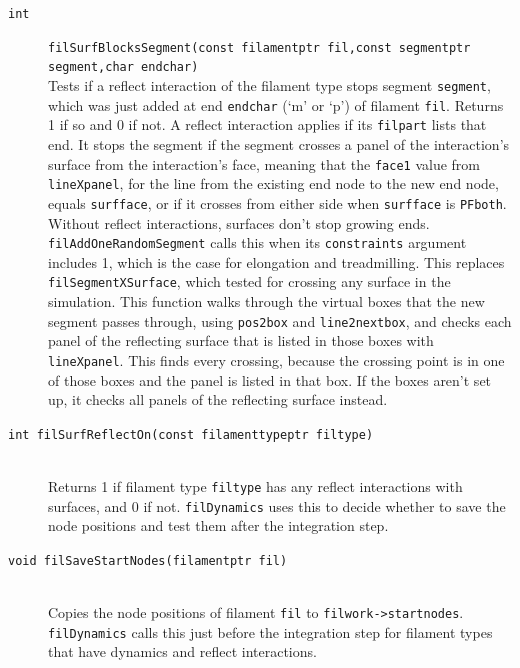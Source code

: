 \documentclass {scrbook}
\newcommand {\ttt} {\texttt}
\begin{document}
\begin{description}
\item[\ttt{int}]
\ttt{filSurfBlocksSegment(const filamentptr fil,const segmentptr segment,char endchar)}
\hfill \\
Tests if a reflect interaction of the filament type stops segment \ttt{segment}, which was just added at end \ttt{endchar} (`m' or `p') of filament \ttt{fil}. Returns 1 if so and 0 if not. A reflect interaction applies if its \ttt{filpart} lists that end. It stops the segment if the segment crosses a panel of the interaction's surface from the interaction's face, meaning that the \ttt{face1} value from \ttt{lineXpanel}, for the line from the existing end node to the new end node, equals \ttt{surfface}, or if it crosses from either side when \ttt{surfface} is \ttt{PFboth}. Without reflect interactions, surfaces don't stop growing ends. \ttt{filAddOneRandomSegment} calls this when its \ttt{constraints} argument includes 1, which is the case for elongation and treadmilling. This replaces \ttt{filSegmentXSurface}, which tested for crossing any surface in the simulation. This function walks through the virtual boxes that the new segment passes through, using \ttt{pos2box} and \ttt{line2nextbox}, and checks each panel of the reflecting surface that is listed in those boxes with \ttt{lineXpanel}. This finds every crossing, because the crossing point is in one of those boxes and the panel is listed in that box. If the boxes aren't set up, it checks all panels of the reflecting surface instead.

\item[\ttt{int filSurfReflectOn(const filamenttypeptr filtype)}] %
\hfill \\
Returns 1 if filament type \ttt{filtype} has any reflect interactions with surfaces, and 0 if not. \ttt{filDynamics} uses this to decide whether to save the node positions and test them after the integration step.

\item[\ttt{void filSaveStartNodes(filamentptr fil)}] %
\hfill \\
Copies the node positions of filament \ttt{fil} to \ttt{filwork->startnodes}. \ttt{filDynamics} calls this just before the integration step for filament types that have dynamics and reflect interactions.


\end{description}
\end{document}

